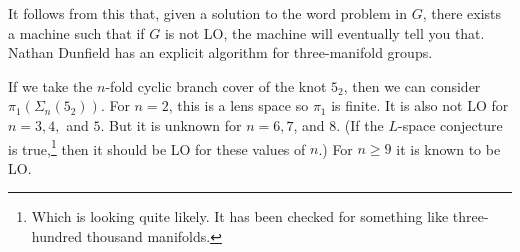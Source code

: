 \begin{rmk}
It follows from this that, given a solution to the word problem in $G$, there exists a
machine such that if $G$ is not LO, the machine will eventually 
tell you that.
Nathan Dunfield has an explicit algorithm for three-manifold groups.
\end{rmk}

\begin{rmk}
If we take the $n$-fold cyclic branch cover of the knot $5_2$, then 
we can consider
$\pi_1\left(\Sigma_n \left(5_2\right)\right)$. For $n = 2$, this is a lens space
so $\pi_1$ is finite. 
It is also not LO for $n = 3,4,$ and $5$. But it is unknown for $n = 6,7$, and $8$.
(If the $L$-space conjecture is true,\footnote{Which is looking quite likely. It has been
checked for something like three-hundred thousand manifolds.}
then it should be LO for these values of $n$.)
For $n\geq 9$ it is known to be LO.
\end{rmk}

